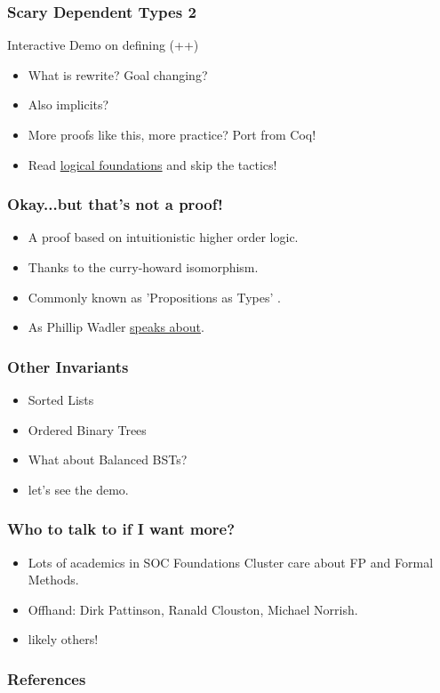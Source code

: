 \documentclass[hyperref={colorlinks = true,linkcolor = blue, citecolor = blue, urlcolor = blue}]{beamer}
\begin{document}
\begin{frame}[fragile]
  \frametitle{Scary Dependent Types 2}
  Interactive Demo on defining (++)
\end{frame}

\begin{frame}[fragile]
  \begin{itemize}
    \item What is rewrite? Goal changing?
    \item Also implicits?
    \item More proofs like this, more practice? Port from Coq!
    \item Read \href{https://softwarefoundations.cis.upenn.edu/lf-current/toc.html}{logical foundations} and
           skip the tactics!
  \end{itemize}
\end{frame}

\begin{frame}[fragile]
  \frametitle{Okay...but that's not a proof!}
    \begin{itemize}
      \item A proof based on intuitionistic higher order logic.
      \item Thanks to the curry-howard isomorphism.
      \item Commonly known as 'Propositions as Types' \citep{wadler2015propositions}.
      \item As Phillip Wadler \href{https://www.youtube.com/watch?v=IOiZatlZtGU}{speaks about}.
    \end{itemize}
\end{frame}

\begin{frame}[fragile]
  \frametitle{Other Invariants}
  \begin{itemize}
    \item Sorted Lists
    \item Ordered Binary Trees
    \item What about Balanced BSTs?
    \item let's see the demo.
  \end{itemize}
\end{frame}

\begin{frame}[fragile]
  \frametitle{Who to talk to if I want more?}
  \begin{itemize}
    \item Lots of academics in SOC Foundations Cluster care 
          about FP and Formal Methods.
    \item Offhand: Dirk Pattinson, Ranald Clouston, Michael Norrish.
    \item likely others!
  \end{itemize}
\end{frame}

\begin{frame}[fragile]
\frametitle{References}
{}
\end{frame}
\end{document}
